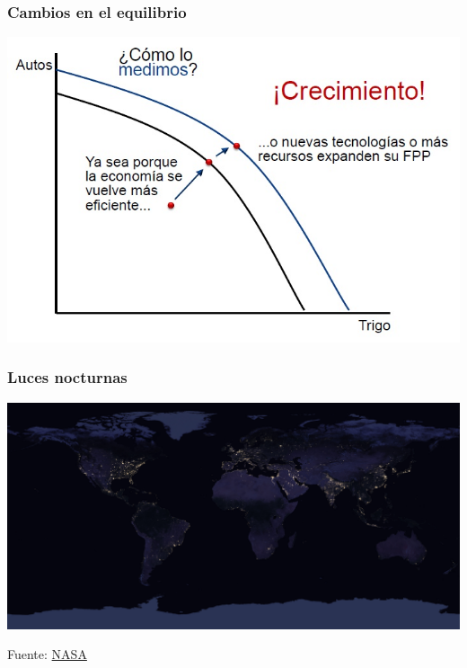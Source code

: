 \documentclass{beamer}
\begin{document}
\begin{frame}
\frametitle{ Cambios en el equilibrio}
\begin{center}
    \includegraphics[scale=0.6]{Tema_11.10_crecimiento.jpg}
\end{center}
\end{frame}

\begin{frame}
\frametitle{ Luces nocturnas}
\begin{center}
    \includegraphics[scale=0.06]{Tema_11.11_crecimiento2.jpg}
\end{center}
Fuente: \href{https://www.nasa.gov/feature/goddard/2017/new-night-lights-maps-open-up-possible-real-time-applications}{NASA}
\end{frame}
\end{document}
